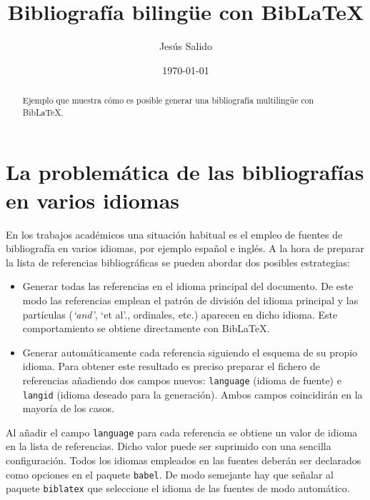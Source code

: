 \documentclass[11pt,a4paper]{article}
\author{Jesús Salido}
\title{Bibliografía bilingüe con Bib\LaTeX{}}
\date{\today}
\begin{document}
\maketitle


\begin{abstract}
Ejemplo que muestra cómo es posible generar una bibliografía multilingüe con Bib\LaTeX.
\end{abstract}


\section{La problemática de las bibliografías en varios idiomas}
En los trabajos académicos una situación habitual es el empleo de fuentes de bibliografía en varios idiomas,\parencite{cascales00,lamport94,goos07} por ejemplo español e inglés. A la hora de preparar la lista de referencias bibliográficas se pueden abordar dos posibles estrategias:
\begin{itemize}
	\item Generar todas las referencias en el idioma principal del documento. De este modo las referencias emplean el patrón de división del idioma principal y las partículas (\emph{`and'}, `et al'., ordinales, etc.) aparecen en dicho idioma. Este comportamiento se obtiene directamente con Bib\LaTeX.
	
	\item Generar automáticamente cada referencia siguiendo el esquema de su propio idioma. Para obtener este resultado es preciso preparar el fichero de referencias añadiendo dos campos nuevos: \texttt{language} (idioma de fuente) e \texttt{langid} (idioma deseado para la generación). Ambos campos coincidirán en la mayoría de los casos.
\end{itemize}

Al añadir el campo \texttt{language} para cada referencia se obtiene un valor de idioma en la lista de referencias. Dicho valor puede ser suprimido con una sencilla configuración. Todos los idiomas empleados en las fuentes deberán ser declarados como opciones en el paquete \texttt{babel}. De modo semejante hay que señalar al paquete \texttt{biblatex} que seleccione el idioma de las fuentes de modo automático.


\nocite{*} %
\printbibliography[title=Bibliografía]
\end{document}
